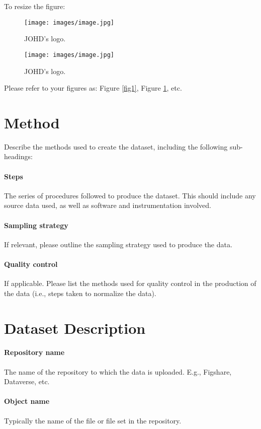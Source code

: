 \documentclass{article}
\begin{document}
\noindent To resize the figure:

\begin{figure}[H]
\centering
\texttt{[image: images/image.jpg]}
\caption{\label{fig2}JOHD's logo.}
\end{figure}

\begin{figure}[H]
\centering
\texttt{[image: images/image.jpg]}
\caption{\label{fig3}JOHD's logo.}
\end{figure}

\noindent Please refer to your figures as: Figure \ref{fig1}, Figure \ref{fig2}, etc.

\section{Method}
Describe the methods used to create the dataset, including the following sub-headings:
\paragraph{Steps} The series of procedures followed to produce the dataset. This should include any source data used, as well as software and instrumentation involved.
\paragraph{Sampling strategy} If relevant, please outline the sampling strategy used to produce the data.
\paragraph{Quality control} If applicable. Please list the methods used for quality control in the production of the data (i.e., steps taken to normalize the data).

\section{Dataset Description}
\paragraph{Repository name} The name of the repository to which the data is uploaded. E.g., Figshare, Dataverse, etc. 
\paragraph{Object name} Typically the name of the file or file set in the repository.
\end{document}
